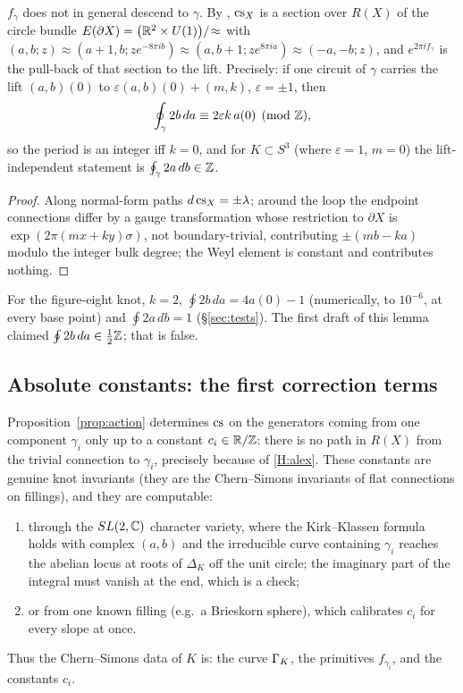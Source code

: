 \begin{lemma}[periods]\label{lem:period}
$f_\gamma$ does not in general descend to $\gamma$.  By \cite{KK93}, $\mathrm{cs}_X$ is a section over $R(X)$ of the circle bundle
$E(\partial X)=\big(\mathbb{R}^2\times U(1)\big)/\!\approx$ with $(a,b;z)\approx(a+1,b;z e^{-8\pi ib})\approx(a,b+1;z e^{8\pi ia})\approx(-a,-b;z)$,
and $e^{2\pi i f_\gamma}$ is the pull-back of that section to the lift.  Precisely: if one circuit of $\gamma$ carries the
lift $(a,b)(0)$ to $\varepsilon(a,b)(0)+(m,k)$, $\varepsilon=\pm1$, then
\[
\oint_\gamma 2b\,da\equiv2\varepsilon k\,a(0)\pmod{\mathbb{Z}},
\]
so the period is an integer iff $k=0$, and for $K\subset S^3$ (where $\varepsilon=1$, $m=0$) the lift-independent
statement is $\oint_\gamma 2a\,db\in\mathbb{Z}$.
\end{lemma}
\begin{proof}
Along normal-form paths $d\,\mathrm{cs}_X=\pm\lambda$; around the loop the endpoint connections differ by a gauge
transformation whose restriction to $\partial X$ is $\exp(2\pi(mx+ky)\sigma)$, not boundary-trivial, contributing
$\pm(mb-ka)$ modulo the integer bulk degree; the Weyl element is constant and contributes nothing.
\end{proof}
For the figure-eight knot, $k=2$, $\oint2b\,da=4a(0)-1$ (numerically, to $10^{-6}$, at every base point) and
$\oint2a\,db=1$ (\S\ref{sec:tests}).  The first draft of this lemma claimed $\oint2b\,da\in\tfrac12\mathbb{Z}$; that is false.

\subsection{Absolute constants: the first correction terms}
Proposition~\ref{prop:action} determines $\mathrm{cs}$ on the generators coming from one component $\gamma_i$ only up to a
constant $c_i\in\mathbb{R}/\mathbb{Z}$: there is no path in $R(X)$ from the trivial connection to $\gamma_i$, precisely because of
\ref{H:alex}.  These constants are genuine knot invariants (they are the Chern--Simons invariants of flat connections
on fillings), and they are computable:
\begin{enumerate}[label=(\roman*)]
\item through the $SL(2,\mathbb{C})$ character variety, where the Kirk--Klassen formula holds with complex $(a,b)$
\cite{KK93} and the irreducible curve containing $\gamma_i$ reaches the abelian locus at roots of $\Delta_K$ off the
unit circle; the imaginary part of the integral must vanish at the end, which is a check;
\item or from one known filling (e.g.\ a Brieskorn sphere), which calibrates $c_i$ for every slope at once.
\end{enumerate}
Thus the Chern--Simons data of $K$ is: the curve $\Gamma_K$, the primitives $f_{\gamma_i}$, and the constants $c_i$.
